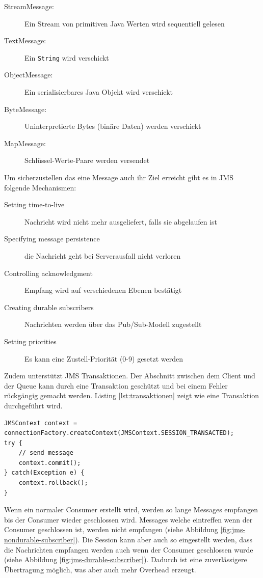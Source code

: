 \begin{description}
	\item[StreamMessage:] Ein Stream von primitiven Java Werten wird sequentiell gelesen
	\item[TextMessage:] Ein \verb|String| wird verschickt
	\item[ObjectMessage:] Ein serialisierbares Java Objekt wird verschickt
	\item[ByteMessage:] Uninterpretierte Bytes (binäre Daten) werden verschickt
	\item[MapMessage:] Schlüssel-Werte-Paare werden versendet
\end{description}

\newpage

Um sicherzustellen das eine Message auch ihr Ziel erreicht gibt es in JMS folgende Mechanismen:

\begin{description}
	\item[Setting time-to-live] Nachricht wird nicht mehr ausgeliefert, falls sie abgelaufen ist
	\item[Specifying message persistence] die Nachricht geht bei Serverausfall nicht verloren
	\item[Controlling acknowledgment] Empfang wird auf verschiedenen Ebenen bestätigt
	\item[Creating durable subscribers] Nachrichten werden über das Pub/Sub-Modell zugestellt
	\item[Setting priorities] Es kann eine Zustell-Priorität (0-9) gesetzt werden
\end{description}

Zudem unterstützt JMS Transaktionen. Der Abschnitt zwischen dem Client und der Queue kann durch eine Transaktion geschützt und bei einem Fehler rückgängig gemacht werden. Listing \ref{lst:transaktionen} zeigt wie eine Transaktion durchgeführt wird.

\begin{lstlisting}[caption=JMS Transaktionen, label=lst:transaktionen]
JMSContext context = connectionFactory.createContext(JMSContext.SESSION_TRANSACTED);
try {
	// send message
	context.commit();
} catch(Exception e) {
	context.rollback();
}
\end{lstlisting}

Wenn ein normaler Consumer erstellt wird, werden so lange Messages empfangen bis der Consumer wieder geschlossen wird. Messages welche eintreffen wenn der Consumer geschlossen ist, werden nicht empfangen (siehe Abbildung \ref{fig:jms-nondurable-subscriber}). Die Session kann aber auch so eingestellt werden, dass die Nachrichten empfangen werden auch wenn der Consumer geschlossen wurde (siehe Abbildung \ref{fig:jms-durable-subscriber}). Dadurch ist eine zuverlässigere Übertragung möglich, was aber auch mehr Overhead erzeugt.

